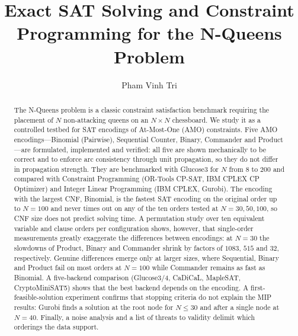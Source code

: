 \documentclass[a4paper,fleqn]{cas-sc}
\begin{document}

\title[mode = title]{Exact SAT Solving and Constraint Programming for the N-Queens Problem}

\author[1]{Pham Vinh Tri}
\address[1]{Faculty of Information Technology, VNU University of Engineering and Technology, 144 Xuan Thuy, Cau Giay, Hanoi, 100000, Vietnam}

\begin{abstract}
The N-Queens problem is a classic constraint satisfaction benchmark requiring the placement of $N$ non-attacking queens on an $N \times N$ chessboard. We study it as a controlled testbed for SAT encodings of At-Most-One (AMO) constraints. Five AMO encodings---Binomial (Pairwise), Sequential Counter, Binary, Commander and Product---are formulated, implemented and verified: all five are shown mechanically to be correct and to enforce arc consistency through unit propagation, so they do not differ in propagation strength. They are benchmarked with Glucose3 for $N$ from $8$ to $200$ and compared with Constraint Programming (OR-Tools CP-SAT, IBM CPLEX CP Optimizer) and Integer Linear Programming (IBM CPLEX, Gurobi). The encoding with the largest CNF, Binomial, is the fastest SAT encoding on the original order up to $N=100$ and never times out on any of the ten orders tested at $N = 30, 50, 100$, so CNF size does not predict solving time. A permutation study over ten equivalent variable and clause orders per configuration shows, however, that single-order measurements greatly exaggerate the differences between encodings: at $N=30$ the slowdowns of Product, Binary and Commander shrink by factors of $1083$, $515$ and $32$, respectively. Genuine differences emerge only at larger sizes, where Sequential, Binary and Product fail on most orders at $N=100$ while Commander remains as fast as Binomial. A five-backend comparison (Glucose3/4, CaDiCaL, MapleSAT, CryptoMiniSAT5) shows that the best backend depends on the encoding. A first-feasible-solution experiment confirms that stopping criteria do not explain the MIP results: Gurobi finds a solution at the root node for $N \leq 30$ and after a single node at $N=40$. Finally, a noise analysis and a list of threats to validity delimit which orderings the data support.
\end{abstract}

\maketitle
\end{document}
